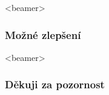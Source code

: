 \documentclass[t]{beamer}
\DeclareMathOperator*{\softmax}{softmax}
\newcommand{\norm}[1]{\lVert #1 \rVert}
\begin{document}
\begin{frame}<beamer>
  \frametitle{Možné zlepšení}
\end{frame}




	




\begin{frame}<beamer>
  \frametitle{Děkuji za pozornost}
  
\end{frame}		
\end{document}
